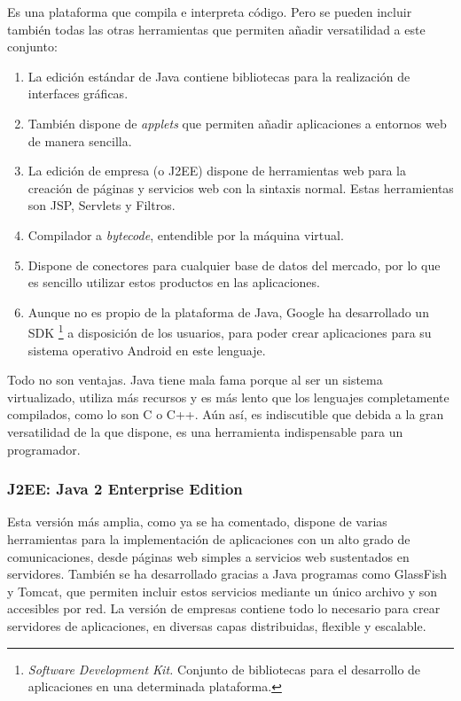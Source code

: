 Es una plataforma que compila e interpreta código. Pero se pueden 
incluir también todas las otras herramientas que permiten añadir 
versatilidad a este conjunto:

\begin{enumerate}
	\item La edición estándar de Java contiene bibliotecas para la 
	realización de interfaces gráficas.
	\item También dispone de \emph{applets} que permiten añadir 
	aplicaciones a entornos web de manera sencilla.
	\item La edición de empresa (o J2EE) dispone de herramientas web 
	para la creación de páginas y servicios web con la sintaxis 
	normal. Estas herramientas son JSP, Servlets y Filtros.
	\item Compilador a \emph{bytecode}, entendible por la máquina 
	virtual.
	\item Dispone de conectores para cualquier base de datos del 
	mercado, por lo que es sencillo utilizar estos productos en las 
	aplicaciones.
	\item Aunque no es propio de la plataforma de Java, Google ha 
	desarrollado un SDK \footnote{\emph{Software Development Kit.} 
	Conjunto de bibliotecas para el desarrollo de aplicaciones en una 
	determinada plataforma.} a disposición de los usuarios, para poder 
	crear aplicaciones para su sistema operativo Android en este 
	lenguaje.
\end{enumerate}

Todo no son ventajas. Java tiene mala fama porque al ser un sistema 
virtualizado, utiliza más recursos y es más lento que los lenguajes 
completamente compilados, como lo son C o C++. Aún así, es 
indiscutible que debida a la gran versatilidad de la que dispone, es 
una herramienta indispensable para un programador.

\subsubsection*{J2EE: Java 2 Enterprise Edition}
\label{subsubsec:j2ee}

Esta versión más amplia, como ya se ha comentado, dispone de varias 
herramientas para la implementación de aplicaciones con un alto grado 
de comunicaciones, desde páginas web simples a servicios web 
sustentados en servidores. También se ha desarrollado gracias a Java 
programas como GlassFish y Tomcat, que permiten incluir estos 
servicios mediante un único archivo y son accesibles por red. La 
versión de empresas contiene todo lo necesario para crear servidores 
de aplicaciones, en diversas capas distribuidas, flexible y escalable.

